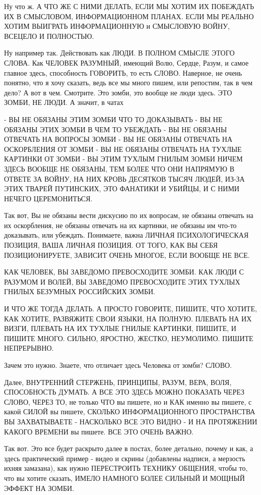 Ну что ж. А ЧТО ЖЕ С НИМИ ДЕЛАТЬ, ЕСЛИ МЫ ХОТИМ ИХ ПОБЕЖДАТЬ
ИХ В СМЫСЛОВОМ, ИНФОРМАЦИОННОМ ПЛАНАХ. ЕСЛИ МЫ РЕАЛЬНО ХОТИМ ВЫИГРАТЬ ИНФОРМАЦИОННУЮ и СМЫСЛОВУЮ ВОЙНУ, ВСЕЦЕЛО И ПОЛНОСТЬЮ.

Ну например так. Действовать как ЛЮДИ. В ПОЛНОМ СМЫСЛЕ ЭТОГО СЛОВА. Как ЧЕЛОВЕК РАЗУМНЫЙ, имеющий Волю, Сердце, Разум, и самое главное здесь, способность ГОВОРИТЬ, то есть СЛОВО. Наверное, не очень понятно, что я хочу сказать, ведь все мы много пишем, или репостим, так в чем дело? А вот в чем. Смотрите. Это зомби, это вообще не люди здесь. ЭТО ЗОМБИ, НЕ ЛЮДИ. А значит, в чатах

- ВЫ НЕ ОБЯЗАНЫ ЭТИМ ЗОМБИ ЧТО ТО ДОКАЗЫВАТЬ
- ВЫ НЕ ОБЯЗАНЫ ЭТИХ ЗОМБИ В ЧЕМ ТО УБЕЖДАТЬ
- ВЫ НЕ ОБЯЗАНЫ ОТВЕЧАТЬ НА  ВОПРОСЫ ЗОМБИ
- ВЫ НЕ ОБЯЗАНЫ ОТВЕЧАТЬ НА  ОСКОРБЛЕНИЯ ОТ ЗОМБИ
- ВЫ НЕ ОБЯЗАНЫ ОТВЕЧАТЬ НА ТУХЛЫЕ КАРТИНКИ ОТ ЗОМБИ
- ВЫ ЭТИМ ТУХЛЫМ ГНИЛЫМ ЗОМБИ НИЧЕМ ЗДЕСЬ ВООБЩЕ НЕ ОБЯЗАНЫ, ТЕМ БОЛЕЕ ЧТО ОНИ
НАПРЯМУЮ В ОТВЕТЕ ЗА ВОЙНУ, НА НИХ КРОВЬ ДЕСЯТКОВ ТЫСЯЧ ЛЮДЕЙ, ИЗ-ЗА ЭТИХ
ТВАРЕЙ ПУТИНСКИХ, ЭТО ФАНАТИКИ И УБИЙЦЫ, И С НИМИ НЕЧЕГО ЦЕРЕМОНИТЬСЯ.

Так вот, Вы не обязаны вести дискусию по их вопросам, не обязаны отвечать на их
оскорбления, не обязаны отвечать на их картинки, не обязаны им что-то
доказывать, или убеждать. Понимаете, важна ЛИЧНАЯ ПСИХОЛОГИЧЕСКАЯ ПОЗИЦИЯ, ВАША
ЛИЧНАЯ ПОЗИЦИЯ. ОТ ТОГО, КАК ВЫ СЕБЯ ПОЗИЦИОНИРУЕТЕ, ЗАВИСИТ ОЧЕНЬ МНОГОЕ, ЕСЛИ
ВООБЩЕ НЕ ВСЕ.

КАК ЧЕЛОВЕК, ВЫ ЗАВЕДОМО ПРЕВОСХОДИТЕ ЗОМБИ. КАК ЛЮДИ С РАЗУМОМ И ВОЛЕЙ, ВЫ
ЗАВЕДОМО ПРЕВОСХОДИТЕ ЭТИХ ТУХЛЫХ ГНИЛЫХ БЕЗУМНЫХ РОССИЙСКИХ ЗОМБИ.

И ЧТО ЖЕ ТОГДА ДЕЛАТЬ. А ПРОСТО ГОВОРИТЕ, ПИШИТЕ, ЧТО ХОТИТЕ, КАК ХОТИТЕ,
РАЗВЯЖИТЕ СВОИ ЯЗЫКИ, НА ПОЛНУЮ. ПЛЕВАТЬ НА ИХ ВИЗГИ, ПЛЕВАТЬ НА ИХ ТУХЛЫЕ
ГНИЛЫЕ КАРТИНКИ, ПИШИТЕ, И ПИШИТЕ МНОГО. СИЛЬНО, ЯРОСТНО, ЖЕСТКО, НЕУМОЛИМО.
ПИШИТЕ НЕПРЕРЫВНО.

Зачем это нужно. Знаете, что отличает здесь Человека от зомби? СЛОВО.

Далее, ВНУТРЕННИЙ СТЕРЖЕНЬ, ПРИНЦИПЫ, РАЗУМ, ВЕРА, ВОЛЯ, СПОСОБНОСТЬ ДУМАТЬ. А
ВСЕ ЭТО ЗДЕСЬ МОЖНО ПОКАЗАТЬ ЧЕРЕЗ СЛОВО, ЧЕРЕЗ ТО, не только ЧТО вы пишете, но
и КАК именно вы пишете, с какой СИЛОЙ вы пишете, СКОЛЬКО ИНФОРМАЦИОННОГО
ПРОСТРАНСТВА ВЫ ЗАХВАТЫВАЕТЕ - НАСКОЛЬКО ВСЕ ЭТО ВИДНО - И НА ПРОТЯЖЕНИИ КАКОГО
ВРЕМЕНИ вы пишете. ВСЕ ЭТО ОЧЕНЬ ВАЖНО. 

Так вот. Это все будет раскрыто далее в постах, более детально, почему и как, а
здесь практический пример - видео и скрины (добавлены надписи, а мерзость ихняя
замазана), как нужно ПЕРЕСТРОИТЬ ТЕХНИКУ ОБЩЕНИЯ, чтобы то, что вы хотите
сказать, ИМЕЛО НАМНОГО БОЛЕЕ СИЛЬНЫЙ И МОЩНЫЙ ЭФФЕКТ НА ЗОМБИ.

